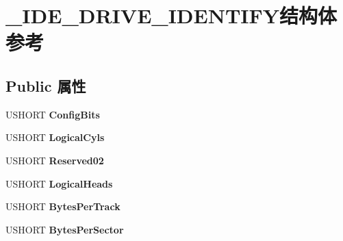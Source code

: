 \hypertarget{struct___i_d_e___d_r_i_v_e___i_d_e_n_t_i_f_y}{}\section{\+\_\+\+I\+D\+E\+\_\+\+D\+R\+I\+V\+E\+\_\+\+I\+D\+E\+N\+T\+I\+F\+Y结构体 参考}
\label{struct___i_d_e___d_r_i_v_e___i_d_e_n_t_i_f_y}
\subsection*{Public 属性}
\begin{DoxyCompactItemize}
\item 
\mbox{\label{struct___i_d_e___d_r_i_v_e___i_d_e_n_t_i_f_y_a972b80407435ff8f27099589bba6dd7b}} 
U\+S\+H\+O\+RT {\bfseries Config\+Bits}
\item 
\mbox{\label{struct___i_d_e___d_r_i_v_e___i_d_e_n_t_i_f_y_a79bf6115554a985d5a120f1a68f0f98f}} 
U\+S\+H\+O\+RT {\bfseries Logical\+Cyls}
\item 
\mbox{\label{struct___i_d_e___d_r_i_v_e___i_d_e_n_t_i_f_y_a9d999cd5ab2e04bbffe342b31b393e90}} 
U\+S\+H\+O\+RT {\bfseries Reserved02}
\item 
\mbox{\label{struct___i_d_e___d_r_i_v_e___i_d_e_n_t_i_f_y_aed7895397ba31d346db23ac101237cba}} 
U\+S\+H\+O\+RT {\bfseries Logical\+Heads}
\item 
\mbox{\label{struct___i_d_e___d_r_i_v_e___i_d_e_n_t_i_f_y_ad718c323152b8309063e0e5639285f2a}} 
U\+S\+H\+O\+RT {\bfseries Bytes\+Per\+Track}
\item 
\mbox{\label{struct___i_d_e___d_r_i_v_e___i_d_e_n_t_i_f_y_af3c8d7fe11335ada5af3556a1d49e3a4}} 
U\+S\+H\+O\+RT {\bfseries Bytes\+Per\+Sector}
\item 
\mbox{\label{struct___i_d_e___d_r_i_v_e___i_d_e_n_t_i_f_y_a9de5a2be2df7e207bfdd5e665b5a23c0}} 

\end{DoxyCompactItemize}

